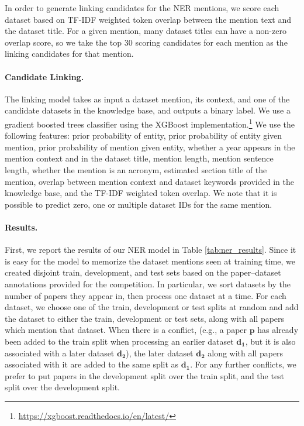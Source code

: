 \documentclass[11pt]{article}
\begin{document}
In order to generate linking candidates for the NER mentions, we score each dataset based on TF-IDF weighted token overlap between the mention text and the dataset title. For a given mention, many dataset titles can have a non-zero overlap score, so we take the top 30 scoring candidates for each mention as the linking candidates for that mention.

\paragraph{Candidate Linking.}
The linking model takes as input a dataset mention, its context, and one of the candidate datasets in the knowledge base, and outputs a binary label.
We use a gradient boosted trees classifier using the  XGBoost implementation.\footnote{\url{https://xgboost.readthedocs.io/en/latest/}}
We use the following features:
prior probability of entity, prior probability of entity given mention, prior probability of mention given entity, whether a year appears in the mention context and in the dataset title, mention length, mention sentence length, whether the mention is an acronym, estimated section title of the mention, overlap between mention context and dataset keywords provided in the knowledge base, and the TF-IDF weighted token overlap.
We note that it is possible to predict zero, one or multiple dataset IDs for the same mention.

\paragraph{Results.}
First, we report the results of our NER model in Table \ref{tab:ner_results}. 
Since it is easy for the model to memorize the dataset mentions seen at training time, we created disjoint train, development, and test sets based on the paper--dataset annotations provided for the competition.
In particular, we sort datasets by the number of papers they appear in, then process one dataset at a time.
For each dataset, we choose one of the train, development or test splits at random and add the dataset to either the train, development or test sets, along with all papers which mention that dataset.
When there is a conflict, (e.g., a paper $\mathbf{p}$ has already been added to the train split when processing an earlier dataset $\mathbf{d_1}$, but it is also associated with a later dataset $\mathbf{d_2}$), the later dataset $\mathbf{d_2}$ along with all papers associated with it are added to the same split as $\mathbf{d_1}$. For any further conflicts, we prefer to put papers in the development split over the train split, and the test split over the development split.
\end{document}
